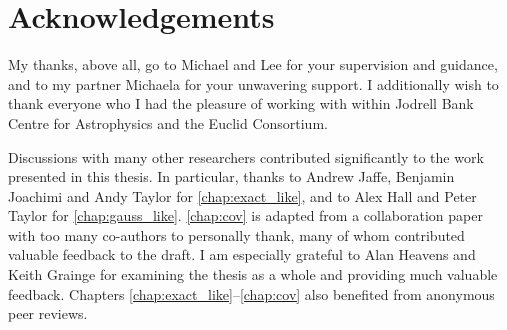 \vspace*{\fill}

\chapter*{Acknowledgements}

My thanks, above all, go to Michael and Lee for your supervision and guidance, and to my partner Michaela for your unwavering support. I additionally wish to thank everyone who I had the pleasure of working with within Jodrell Bank Centre for Astrophysics and the Euclid Consortium.

Discussions with many other researchers contributed significantly to the work presented in this thesis. In particular, thanks to Andrew Jaffe, Benjamin Joachimi and Andy Taylor for \autoref{chap:exact_like}, and to Alex Hall and Peter Taylor for \autoref{chap:gauss_like}. \autoref{chap:cov} is adapted from a \Euclid{} collaboration paper with too many co-authors to personally thank, many of whom contributed valuable feedback to the draft. I am especially grateful to Alan Heavens and Keith Grainge for examining the thesis as a whole and providing much valuable feedback. Chapters \ref{chap:exact_like}--\ref{chap:cov} also benefited from anonymous peer reviews.

